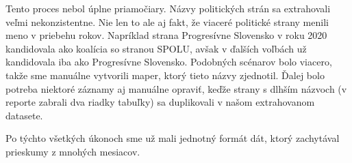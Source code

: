 \documentclass[main.tex]{subfiles}
\begin{document}
Tento proces nebol úplne priamočiary. Názvy politických strán sa extrahovali veľmi nekonzistentne.
Nie len to ale aj fakt, že viaceré politické strany menili meno v priebehu rokov.
Napríklad strana Progresívne Slovensko v roku 2020 kandidovala ako koalícia so stranou SPOLU, avšak v ďalších voľbách už kandidovala iba ako Progresívne Slovensko.
Podobných scénarov bolo viacero, takže sme manuálne vytvorili maper, ktorý tieto názvy zjednotil.
Ďalej bolo potreba niektoré záznamy aj manuálne opraviť, keďže strany s dlhším názvoch (v reporte zabrali dva riadky tabuľky) sa duplikovali v našom extrahovanom datasete.

Po týchto všetkých úkonoch sme už mali jednotný formát dát, ktorý zachytával prieskumy z mnohých mesiacov.
\end{document}
